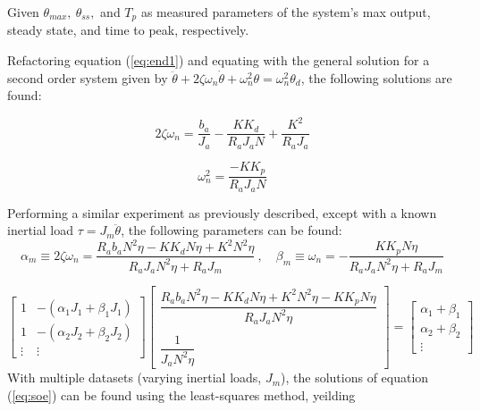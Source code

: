 Given $\theta_{max},~\theta_{ss},$ and $T_p$ as measured parameters of the system's max output, steady state, and time to peak, respectively.

Refactoring equation (\ref{eq:end1}) and equating with the general solution for a second order system given by $\ddot{\theta} + 2\zeta\omega_n\dot{\theta} + \omega_n^2\theta = \omega_n^2\theta_d$, the following solutions are found:

\begin{minipage}[c]{.5\textwidth}
\begin{equation}
  2\zeta\omega_n = \frac{b_a}{J_a} - \frac{KK_d}{R_aJ_aN} + \frac{K^2}{R_aJ_a}
  \label{eq:one}
\end{equation}
\end{minipage}%
\begin{minipage}[c]{.5\textwidth}
\begin{equation}
  \omega_n^2 = \frac{-KK_p}{R_aJ_aN}
  \label{eq:two}
\end{equation}
\end{minipage}

Performing a similar experiment as previously described, except with a known inertial load $\tau = J_m\ddot{\theta}$, the following parameters can be found:
\[
  \alpha_m \equiv 2\zeta\omega_n = \frac{R_ab_aN^2\eta-KK_dN\eta+K^2N^2\eta}{R_aJ_aN^2\eta+R_aJ_m}~,\quad
  \beta_m \equiv \omega_n =-\frac{KK_pN\eta}{R_aJ_aN^2\eta+R_aJ_m}
\]

\begin{equation}
\begin{bmatrix}
  1 & -(\alpha_1J_1+\beta_1J_1) \\
  1 & -(\alpha_2J_2+\beta_2J_2) \\
  \vdots & \vdots
\end{bmatrix}
\begin{bmatrix}
  \dfrac{R_ab_aN^2\eta-KK_dN\eta+K^2N^2\eta-KK_pN\eta}{R_aJ_aN^2\eta} \\
  ~\\
  \dfrac{1}{J_aN^2\eta}
\end{bmatrix}
=
\begin{bmatrix}
  \alpha_1+\beta_1 \\
  \alpha_2+\beta_2 \\
  \vdots
\end{bmatrix}
\label{eq:soe}
\end{equation}
With multiple datasets (varying inertial loads, $J_m$), the solutions of equation (\ref{eq:soe}) can be found using the least-squares method, yeilding

